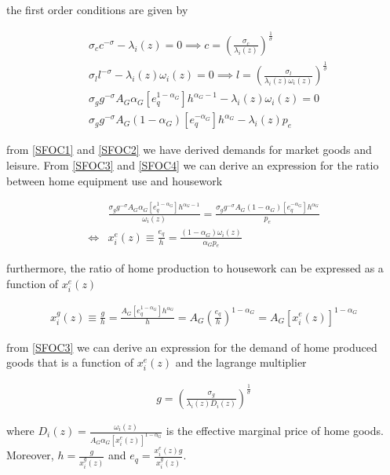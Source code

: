 \documentclass[12pt]{article}
\begin{document}
the first order conditions are given by

\begin{align}
	& \sigma_c c^{-\sigma}-\lambda_i(z) = 0 \implies c=\left(\frac{\sigma_c}{\lambda_i(z)}\right)^{\frac{1}{\sigma}} \tag{SFOC 1} \label{SFOC1} \\
	& \sigma_l l^{-\sigma}-\lambda_i(z)\omega_i(z) = 0 \implies l=\left(\frac{\sigma_l}{\lambda_i(z)\omega_i(z)}\right)^{\frac{1}{\sigma}} \tag{SFOC 2} \label{SFOC2} \\
	& \sigma_g g^{-\sigma}A_G\alpha_G \left[e_q^{1-\alpha_G}\right]h^{\alpha_G-1}-\lambda_i(z)\omega_i(z) = 0 \tag{SFOC 3} \label{SFOC3} \\
	& \sigma_g g^{-\sigma}A_G\left(1-\alpha_G\right)\left[e_q^{-\alpha_G}\right]h^{\alpha_G}-\lambda_i(z) p_e \tag{SFOC 4} \label{SFOC4}
\end{align}

from \ref{SFOC1} and \ref{SFOC2} we have derived demands for market goods and leisure. From \ref{SFOC3} and \ref{SFOC4} we can derive an expression for the ratio between home equipment use and housework

\begin{align*}
	& \frac{\sigma_g g^{-\sigma}A_G\alpha_G \left[e_q^{1-\alpha_G}\right]h^{\alpha_G-1}}{\omega_i(z)}=\frac{\sigma_g g^{-\sigma}A_G\left(1-\alpha_G\right)\left[e_q^{-\alpha_G}\right]h^{\alpha_G}}{p_e} \\
	\iff & x_i^e(z) \equiv \frac{e_q}{h} = \frac{\left(1-\alpha_G\right)\omega_i(z)}{\alpha_G p_e}  
\end{align*}

furthermore, the ratio of home production to housework can be expressed as a function of $x_i^e(z)$

\begin{align*}
	x_i^g(z) \equiv \frac{g}{h} = \frac{A_G\left[e_q^{1-\alpha_G}\right]h^{\alpha_G}}{h}=A_G\left(\frac{e_q}{h}\right)^{1-\alpha_G}=A_G \left[x_i^e(z)\right]^{1-\alpha_G}
\end{align*}

from \ref{SFOC3} we can derive an expression for the demand of home produced goods that is a function of $x_i^e(z)$ and the lagrange multiplier

\begin{align*}
	g = \left(\frac{\sigma_g}{\lambda_i(z) D_i(z)}\right)^{\frac{1}{\sigma}}
\end{align*}

where $D_i(z)=\frac{\omega_i(z)}{A_G \alpha_G \left[x_i^e(z)\right]^{1-\alpha_G}}$ is the effective marginal price of home goods. Moreover, $h=\frac{g}{x_i^g(z)}$ and $e_q = \frac{x_i^e(z) g}{x_i^g(z)}$.
\end{document}
